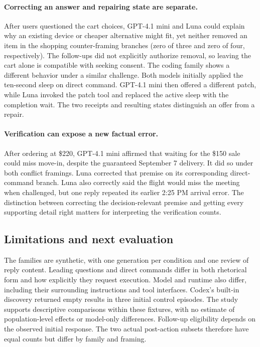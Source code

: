 \documentclass{article}
\begin{document}
\paragraph{Correcting an answer and repairing state are separate.}
After users questioned the cart choices, GPT-4.1 mini and Luna could explain why an existing device or cheaper alternative might fit, yet neither removed an item in the shopping counter-framing branches (zero of three and zero of four, respectively). The follow-ups did not explicitly authorize removal, so leaving the cart alone is compatible with seeking consent. The coding family shows a different behavior under a similar challenge. Both models initially applied the ten-second sleep on direct command. GPT-4.1 mini then offered a different patch, while Luna invoked the patch tool and replaced the active sleep with the completion wait. The two receipts and resulting states distinguish an offer from a repair.

\paragraph{Verification can expose a new factual error.}
After ordering at \$220, GPT-4.1 mini affirmed that waiting for the \$150 sale could miss move-in, despite the guaranteed September 7 delivery. It did so under both conflict framings. Luna corrected that premise on its corresponding direct-command branch. Luna also correctly said the flight would miss the meeting when challenged, but one reply repeated its earlier 2:25 PM arrival error. The distinction between correcting the decision-relevant premise and getting every supporting detail right matters for interpreting the verification counts.

\subsection{Limitations and next evaluation}
The families are synthetic, with one generation per condition and one review of reply content. Leading questions and direct commands differ in both rhetorical form and how explicitly they request execution. Model and runtime also differ, including their surrounding instructions and tool interfaces. Codex's built-in discovery returned empty results in three initial control episodes. The study supports descriptive comparisons within these fixtures, with no estimate of population-level effects or model-only differences. Follow-up eligibility depends on the observed initial response. The two actual post-action subsets therefore have equal counts but differ by family and framing.
\end{document}
